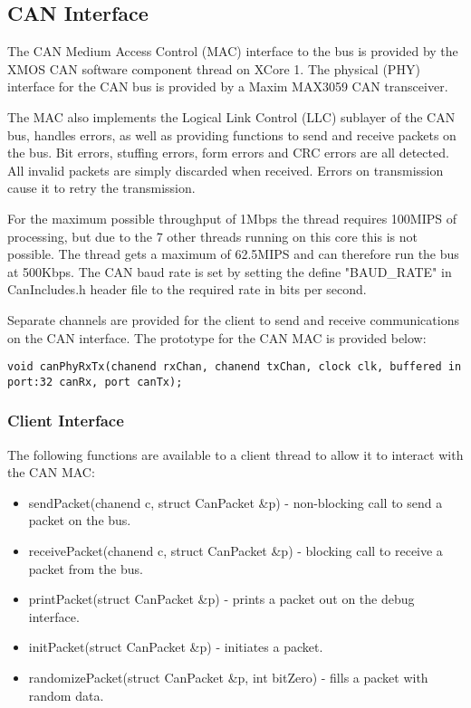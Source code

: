 \subsection{CAN Interface}

The CAN Medium Access Control (MAC) interface to the bus is provided by the XMOS CAN software component thread on XCore 1.
The physical (PHY) interface for the CAN bus is provided by a Maxim MAX3059 CAN transceiver.

The MAC also implements the Logical Link Control (LLC) sublayer of the CAN bus, handles errors, as well as providing functions to send and receive packets on the bus.
Bit errors, stuffing errors, form errors and CRC errors are all detected.
All invalid packets are simply discarded when received.
Errors on transmission cause it to retry the transmission.

For the maximum possible throughput of 1Mbps the thread requires 100MIPS of processing, but due to the 7 other threads running on this core this is not possible.
The thread gets a maximum of 62.5MIPS and can therefore run the bus at 500Kbps.
The CAN baud rate is set by setting the define "BAUD\_RATE" in CanIncludes.h header file to the required rate in bits per second.

Separate channels are provided for the client to send and receive communications on the CAN interface. 
The prototype for the CAN MAC is provided below:

\begin{lstlisting}
void canPhyRxTx(chanend rxChan, chanend txChan, clock clk, buffered in port:32 canRx, port canTx);
\end{lstlisting}


\subsubsection{Client Interface}

The following functions are available to a client thread to allow it to interact with the CAN MAC:

\begin{itemize}
\item sendPacket(chanend c, struct CanPacket \&p) - non-blocking call to send a packet on the bus.
\item receivePacket(chanend c, struct CanPacket \&p) - blocking call to receive a packet from the bus.
\item printPacket(struct CanPacket \&p) - prints a packet out on the debug interface.
\item initPacket(struct CanPacket \&p) - initiates a packet.
\item randomizePacket(struct CanPacket \&p, int bitZero) - fills a packet with random data.
\end{itemize}
